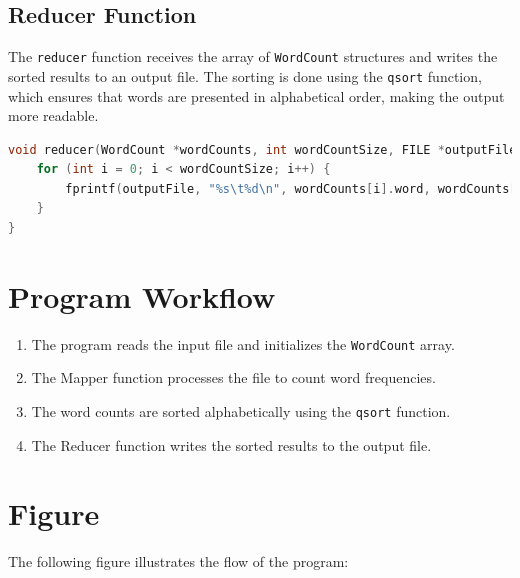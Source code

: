 \documentclass[12pt]{article}
\begin{document}
\subsection*{Reducer Function}
The \texttt{reducer} function receives the array of \texttt{WordCount} structures and writes the sorted results to an output file. The sorting is done using the \texttt{qsort} function, which ensures that words are presented in alphabetical order, making the output more readable.

\begin{lstlisting}[language=C, caption=Reducer Function]
void reducer(WordCount *wordCounts, int wordCountSize, FILE *outputFile) {
    for (int i = 0; i < wordCountSize; i++) {
        fprintf(outputFile, "%s\t%d\n", wordCounts[i].word, wordCounts[i].count);
    }
}
\end{lstlisting}

\section*{Program Workflow}

\begin{enumerate}
    \item The program reads the input file and initializes the \texttt{WordCount} array.
    \item The Mapper function processes the file to count word frequencies.
    \item The word counts are sorted alphabetically using the \texttt{qsort} function.
    \item The Reducer function writes the sorted results to the output file.
\end{enumerate}

\section*{Figure}
The following figure illustrates the flow of the program:
\end{document}
